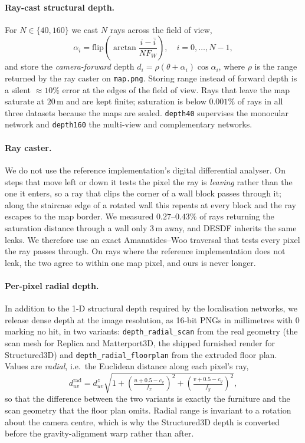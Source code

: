 \paragraph{Ray-cast structural depth.}
For $N \in \{40, 160\}$ we cast $N$ rays across the field of view,
\begin{equation}
  \alpha_i = \mathrm{flip}\!\left(\arctan \frac{i - \bar{i}}{N F_W}\right), \quad
  i = 0,\dots,N-1,
\end{equation}
and store the \emph{camera-forward} depth
$d_i = \rho(\theta + \alpha_i)\cos\alpha_i$, where $\rho$ is the range returned by
the ray caster on \texttt{map.png}. Storing range instead of forward depth is a
silent ${\approx}10\%$ error at the edges of the field of view. Rays that leave the
map saturate at $20\,\mathrm{m}$ and are kept finite; saturation is below $0.001\%$
of rays in all three datasets because the maps are sealed. \texttt{depth40}
supervises the monocular network and \texttt{depth160} the multi-view and
complementary networks.

\paragraph{Ray caster.}
We do not use the reference implementation's digital differential analyser. On
steps that move left or down it tests the pixel the ray is \emph{leaving} rather
than the one it enters, so a ray that clips the corner of a wall block passes
through it; along the staircase edge of a rotated wall this repeats at every block
and the ray escapes to the map border. We measured $0.27$--$0.43\%$ of rays
returning the saturation distance through a wall only $3\,\mathrm{m}$ away, and
DESDF inherits the same leaks. We therefore use an exact Amanatides--Woo traversal
that tests every pixel the ray passes through. On rays where the reference
implementation does not leak, the two agree to within one map pixel, and ours is
never longer.

\paragraph{Per-pixel radial depth.}
In addition to the 1-D structural depth required by the localisation networks, we
release dense depth at the image resolution, as 16-bit PNGs in millimetres with
$0$ marking no hit, in two variants: \texttt{depth\_radial\_scan} from the real
geometry (the scan mesh for Replica and Matterport3D, the shipped furnished render
for Structured3D) and \texttt{depth\_radial\_floorplan} from the extruded floor
plan. Values are \emph{radial}, i.e.\ the Euclidean distance along each pixel's
ray,
\begin{equation}
  d^{\mathrm{rad}}_{uv} = d^{z}_{uv}\sqrt{1 + \left(\tfrac{u + 0.5 - c_x}{f_x}\right)^2 + \left(\tfrac{v + 0.5 - c_y}{f_y}\right)^2},
\end{equation}
so that the difference between the two variants is exactly the furniture and the
scan geometry that the floor plan omits. Radial range is invariant to a rotation
about the camera centre, which is why the Structured3D depth is converted before
the gravity-alignment warp rather than after.

